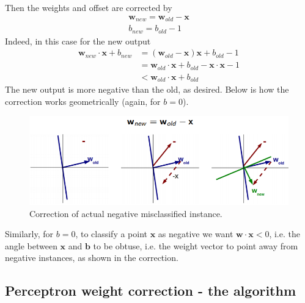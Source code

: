 \documentclass[a4paper]{article}
\begin{document}
\begin{itemize}
    Then the weights and offset are corrected by
            \begin{gather*}
            \textbf{w}_{new} = \textbf{w}_{old} - \textbf{x} \\
            b_{new} = b_{old} - 1
        \end{gather*}
    Indeed, in this case for the new output
        \[
    \begin{split}
        \textbf{w}_{new}\cdot \textbf{x} + b_{new} 
        &= \left( \textbf{w}_{old} - \textbf{x} \right)\textbf{x} + b_{old} - 1\\
        &=\textbf{w}_{old}\cdot \textbf{x} + b_{old} - \textbf{x} \cdot \textbf{x} - 1\\
        &<  \textbf{w}_{old}\cdot \textbf{x} + b_{old}
    \end{split}
    \]
    The new output is more negative than the old, as desired. Below is how the correction works geometrically (again, for $b=0$).
        \begin{figure}[H]
        \centering
        \includegraphics[scale=0.75]{img/line_neg_correction.PNG}
        \caption{Correction of actual negative misclassified instance.}
    \end{figure}
    Similarly, for $b=0$, to classify a point $\textbf{x}$ as negative we want $\textbf{w}\cdot \textbf{x} < 0$, i.e. the angle between $\textbf{x}$ and $\textbf{b}$ to be obtuse, i.e. the weight vector to point away from negative instances, as shown in the correction.
\end{itemize}


\subsection{Perceptron weight correction - the algorithm}
\end{document}
